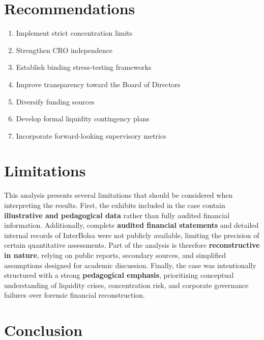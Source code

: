 \vspace{0.5cm}

\section{Recommendations}

\begin{enumerate}
    \item Implement strict concentration limits
    \item Strengthen CRO independence
    \item Establish binding stress-testing frameworks
    \item Improve transparency toward the Board of Directors
    \item Diversify funding sources
    \item Develop formal liquidity contingency plans
    \item Incorporate forward-looking supervisory metrics
\end{enumerate}

\vspace{0.5cm}

\section{Limitations}

This analysis presents several limitations that should be considered when interpreting the results. First, the exhibits included in the case contain \textbf{illustrative and pedagogical data} rather than fully audited financial information. Additionally, complete \textbf{audited financial statements} and detailed internal records of InterBolsa were not publicly available, limiting the precision of certain quantitative assessments. Part of the analysis is therefore \textbf{reconstructive in nature}, relying on public reports, secondary sources, and simplified assumptions designed for academic discussion. Finally, the case was intentionally structured with a strong \textbf{pedagogical emphasis}, prioritizing conceptual understanding of liquidity crises, concentration risk, and corporate governance failures over forensic financial reconstruction.

\vspace{0.5cm}

\section{Conclusion}

